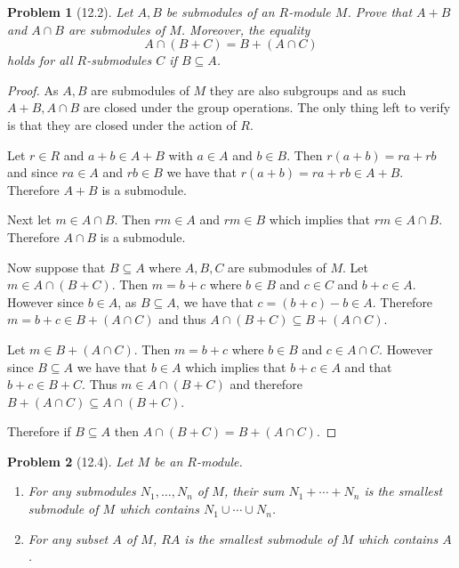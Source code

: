 \documentclass[10pt]{article}
\newcommand{\sk}{\vskip 10mm}
\theoremstyle{plain}
\newtheorem{problem}{Problem}
\theoremstyle{remark}
\begin{document}
\sk

\begin{problem}[12.2]
  Let $A,B$ be submodules of an $R$-module $M$. Prove that $A+B$
  and $A\cap B$ are submodules of $M$. Moreover, the equality
  \[ A\cap(B+C)=B+(A\cap C)\]
  holds for all $R$-submodules $C$ if $B\subseteq A$.
\end{problem}

\begin{proof}
  As $A,B$ are submodules of $M$ they are also subgroups and as such $A+B,A\cap B$ are
  closed under the group operations. The only thing left to verify is that
  they are closed under the action of $R$.

  Let $r\in R$ and $a+b\in A+B$ with $a\in A$ and $b\in B$. Then $r(a+b)=ra+rb$ and
  since $ra\in A$ and $rb\in B$ we have that $r(a+b)=ra+rb\in A+B$. Therefore $A+B$ is
  a submodule.

  Next let $m\in A\cap B$. Then $rm\in A$ and $rm\in B$ which implies that $rm\in A\cap B$.
  Therefore $A\cap B$ is a submodule.

  Now suppose that $B\subseteq A$ where $A,B,C$ are submodules of $M$. Let
  $m\in A\cap(B+C)$. Then $m=b+c$ where $b\in B$ and $c\in C$ and $b+c\in A$. However since
  $b\in A$, as $B\subseteq A$, we have that $c=(b+c)-b\in A$. Therefore $m=b+c\in B+(A\cap C)$
  and thus $A\cap(B+C)\subseteq B+(A\cap C)$.

  Let $m\in B+(A\cap C)$. Then $m=b+c$ where $b\in B$ and $c\in A\cap C$. However since
  $B\subseteq A$ we have that $b\in A$ which implies that $b+c\in A$ and that $b+c\in B+C$.
  Thus $m\in A\cap(B+C)$ and therefore $B+(A\cap C)\subseteq A\cap(B+C)$.

  Therefore if $B\subseteq A$ then $A\cap(B+C)=B+(A\cap C)$.
\end{proof}

\sk

\begin{problem}[12.4]
  Let $M$ be an $R$-module.
  \begin{enumerate}
  \item For any submodules $N_1,\ldots,N_n$ of $M$, their sum
    $N_1+\cdots+N_n$ is the smallest submodule of $M$ which contains
    $N_1\cup\cdots\cup N_n$.
  \item For any subset $A$ of $M$, $RA$ is the smallest submodule
    of $M$ which contains $A$.
  \end{enumerate}
\end{problem}
\end{document}
